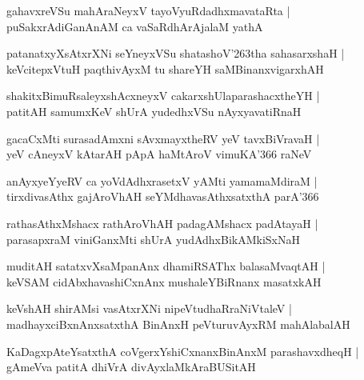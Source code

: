 \documentclass[twoside,12pt,openright]{book}
\def\S{\char'263}
\newcounter{shloka}[chapter]
\begin{document}
\begin{shloka}%
gahavxreVSu mahAraNeyxV tayoVyuRdadhxmavataRta |\\
puSakxrAdiGanAnAM ca vaSaRdhArAjalaM yathA 
\end{shloka}

\begin{shloka}%
patanatxyXsAtxrXNi seYneyxVSu shatashoV\S tha sahasarxshaH |\\
keVcitepxVtuH paqthivAyxM tu shareYH saMBinanxvigarxhAH  
\end{shloka}

\begin{shloka}%
shakitxBimuRsaleyxshAcxneyxV cakarxshUlaparashacxtheYH |\\
patitAH samumxKeV shUrA yudedhxVSu nAyxyavatiRnaH  
\end{shloka}

\begin{shloka}%
gacaCxMti surasadAmxni sAvxmayxtheRV yeV tavxBiVravaH |\\
yeV cAneyxV kAtarAH pApA haMtAroV vimuKA\char'366 raNeV 
\end{shloka}

\begin{shloka}%
anAyxyeYyeRV ca yoVdAdhxrasetxV yAMti yamamaMdiraM |\\
tirxdivasAthx gajAroVhAH seYMdhavasAthxsatxthA parA\char'366 
\end{shloka}

\begin{shloka}%
rathasAthxMshacx rathAroVhAH padagAMshacx padAtayaH |\\
parasapxraM viniGanxMti shUrA yudAdhxBikAMkiSxNaH 
\end{shloka}

\begin{shloka}%
muditAH satatxvXsaMpanAnx dhamiRSAThx balasaMvaqtAH |\\
keVSAM cidAbxhavashiCxnAnx mushaleYBiRnanx masatxkAH 
\end{shloka}

\begin{shloka}%
keVshAH shirAMsi vasAtxrXNi nipeVtudhaRraNiVtaleV |\\
madhayxciBxnAnxsatxthA BinAnxH peVturuvAyxRM mahAlabalAH 
\end{shloka}

\begin{shloka}%
KaDagxpAteYsatxthA coVgerxYshiCxnanxBinAnxM parashavxdheqH |\\
gAmeVva patitA dhiVrA divAyxlaMkAraBUSitAH 
\end{shloka}
\end{document}
